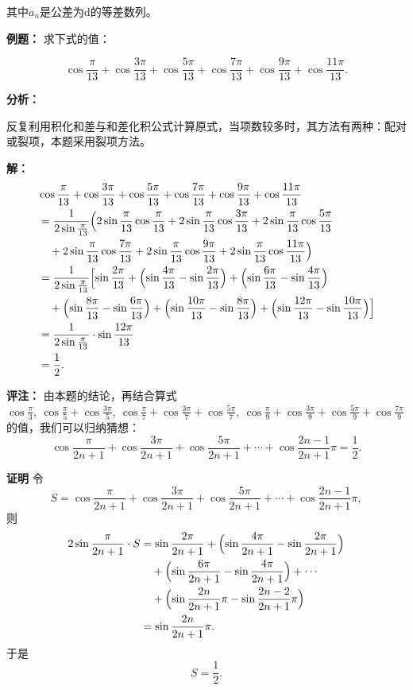 \documentclass{article}
\begin{document}
其中$a_n$是公差为d的等差数列。
\newpage

\noindent\textbf{例题： } 求下式的值：

\[
\cos\frac{\pi}{13}+\cos\frac{3\pi}{13}+\cos\frac{5\pi}{13}+\cos\frac{7\pi}{13}+\cos\frac{9\pi}{13}+\cos\frac{11\pi}{13}.
\]
\vspace{1\baselineskip}

\noindent\textbf{分析： } 

反复利用积化和差与和差化积公式计算原式，当项数较多时，其方法有两种：配对或裂项，本题采用裂项方法。

\noindent\textbf{解： }
\begin{align*}
&\cos\frac{\pi}{13}+\cos\frac{3\pi}{13}+\cos\frac{5\pi}{13}+\cos\frac{7\pi}{13}+\cos\frac{9\pi}{13}+\cos\frac{11\pi}{13} \\
&= \frac{1}{2\sin\frac{\pi}{13}}\Bigl(2\sin\frac{\pi}{13}\cos\frac{\pi}{13}+2\sin\frac{\pi}{13}\cos\frac{3\pi}{13}+2\sin\frac{\pi}{13}\cos\frac{5\pi}{13} \\
&\quad +2\sin\frac{\pi}{13}\cos\frac{7\pi}{13}+2\sin\frac{\pi}{13}\cos\frac{9\pi}{13}+2\sin\frac{\pi}{13}\cos\frac{11\pi}{13}\Bigr) \\
&= \frac{1}{2\sin\frac{\pi}{13}}\Bigl[\sin\frac{2\pi}{13}+\Bigl(\sin\frac{4\pi}{13}-\sin\frac{2\pi}{13}\Bigr)+\Bigl(\sin\frac{6\pi}{13}-\sin\frac{4\pi}{13}\Bigr) \\
&\quad +\Bigl(\sin\frac{8\pi}{13}-\sin\frac{6\pi}{13}\Bigr)+\Bigl(\sin\frac{10\pi}{13}-\sin\frac{8\pi}{13}\Bigr)+\Bigl(\sin\frac{12\pi}{13}-\sin\frac{10\pi}{13}\Bigr)\Bigr] \\
&= \frac{1}{2\sin\frac{\pi}{13}}\cdot\sin\frac{12\pi}{13} \\
&= \frac{1}{2}.
\end{align*}

\noindent\textbf{评注： } 
由本题的结论，再结合算式 $\cos\frac{\pi}{3},\ \cos\frac{\pi}{5}+\cos\frac{3\pi}{5},\ \cos\frac{\pi}{7}+\cos\frac{3\pi}{7}+\cos\frac{5\pi}{7},\ \cos\frac{\pi}{9}+\cos\frac{3\pi}{9}+\cos\frac{5\pi}{9}+\cos\frac{7\pi}{9}$ 的值，我们可以归纳猜想：
\[
\cos\frac{\pi}{2n+1}+\cos\frac{3\pi}{2n+1}+\cos\frac{5\pi}{2n+1}+\cdots+\cos\frac{2n-1}{2n+1}\pi=\frac{1}{2}.
\]

\noindent\textbf{证明} 令
\[
S = \cos\frac{\pi}{2n+1}+\cos\frac{3\pi}{2n+1}+\cos\frac{5\pi}{2n+1}+\cdots+\cos\frac{2n-1}{2n+1}\pi,
\]
则
\begin{align*}
2\sin\frac{\pi}{2n+1}\cdot S &= \sin\frac{2\pi}{2n+1}+\Bigl(\sin\frac{4\pi}{2n+1}-\sin\frac{2\pi}{2n+1}\Bigr) \\
&\quad +\Bigl(\sin\frac{6\pi}{2n+1}-\sin\frac{4\pi}{2n+1}\Bigr)+\cdots \\
&\quad +\Bigl(\sin\frac{2n}{2n+1}\pi-\sin\frac{2n-2}{2n+1}\pi\Bigr) \\
&= \sin\frac{2n}{2n+1}\pi.
\end{align*}
于是
\[
S = \frac{1}{2}.
\]
\end{document}
